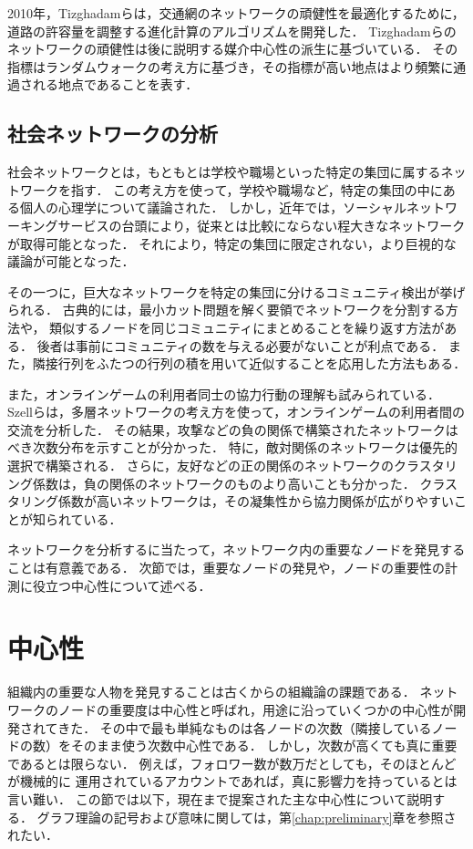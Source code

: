 2010年，Tizghadamらは，交通網のネットワークの頑健性を最適化するために，
道路の許容量を調整する進化計算のアルゴリズムを開発した\cite{Tizghadam2010}．
Tizghadamらのネットワークの頑健性は後に説明する媒介中心性の派生に基づいている．
その指標はランダムウォークの考え方に基づき，その指標が高い地点はより頻繁に通過される地点であることを表す．

\subsection{社会ネットワークの分析}

社会ネットワークとは，もともとは学校や職場といった特定の集団に属するネットワークを指す．
この考え方を使って，学校や職場など，特定の集団の中にある個人の心理学について議論された\cite{Moreno1978}．
しかし，近年では，ソーシャルネットワーキングサービスの台頭により，従来とは比較にならない程大きなネットワークが取得可能となった．
それにより，特定の集団に限定されない，より巨視的な議論が可能となった．

その一つに，巨大なネットワークを特定の集団に分けるコミュニティ検出\cite{Fortunato2010}が挙げられる．
古典的には，最小カット問題を解く要領でネットワークを分割する方法や，
類似するノードを同じコミュニティにまとめることを繰り返す方法がある．
後者は事前にコミュニティの数を与える必要がないことが利点である．
また，隣接行列をふたつの行列の積を用いて近似することを応用した方法\cite{Wang2011}もある．

また，オンラインゲームの利用者同士の協力行動の理解も試みられている．
Szellらは，多層ネットワークの考え方を使って，オンラインゲームの利用者間の交流を分析した\cite{Szell2010}．
その結果，攻撃などの負の関係で構築されたネットワークはべき次数分布を示すことが分かった．
特に，敵対関係のネットワークは優先的選択\cite{Barabasi1999}で構築される．
さらに，友好などの正の関係のネットワークのクラスタリング係数は，負の関係のネットワークのものより高いことも分かった．
クラスタリング係数が高いネットワークは，その凝集性から協力関係が広がりやすいことが知られている．

ネットワークを分析するに当たって，ネットワーク内の重要なノードを発見することは有意義である．
次節では，重要なノードの発見や，ノードの重要性の計測に役立つ中心性について述べる．

\section{中心性}
\label{sect:centrality}

組織内の重要な人物を発見することは古くからの組織論の課題である\cite{Christie1952,Ibarra1993}．
ネットワークのノードの重要度は中心性と呼ばれ，用途に沿っていくつかの中心性が開発されてきた．
その中で最も単純なものは各ノードの次数（隣接しているノードの数）をそのまま使う次数中心性である．
しかし，次数が高くても真に重要であるとは限らない．
例えば，フォロワー数が数万だとしても，そのほとんどが機械的に
運用されているアカウントであれば，真に影響力を持っているとは言い難い．
この節では以下，現在まで提案された主な中心性について説明する．
グラフ理論の記号および意味に関しては，第\ref{chap:preliminary}章を参照されたい．

